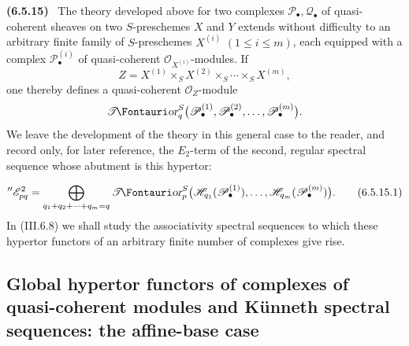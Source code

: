 \documentclass[10pt,oneside]{book}
\newcommand{\sh}[1]{\mathscr{#1}}
\newcommand{\shTor}{\sh{T}\textup{\kern-2.2pt{\Fontauri\slshape or}}}
\newcommand{\sref}[2][]{(#2)}
\newcommand{\oldpage}[2][]{\setcounter{footnote}{0}\marginpar{\scriptsize\textbf{#1}~|~#2}\ignorespaces}
\newenvironment{env}[1][]{\par\medskip\noindent\textbf{(#1)}\ }{\par}
\begin{document}
\begin{env}[6.5.15]
\label{III.6.5.15}
The theory developed above for two complexes
$\sh P_\bullet,\sh Q_\bullet$ of quasi-coherent sheaves on two
$S$-preschemes $X$ and $Y$ extends without difficulty to an
arbitrary finite family of $S$-preschemes $X^{(i)}$
$(1\leq i\leq m)$, each equipped with a complex
$\sh P_\bullet^{(i)}$ of quasi-coherent
$\sh O_{X^{(i)}}$-modules.  If
\[
  Z=X^{(1)}\times_SX^{(2)}\times_S\cdots\times_SX^{(m)},
\]
one thereby defines a quasi-coherent $\sh O_Z$-module
\[
  \shTor_q^S
  \bigl(\sh P_\bullet^{(1)},\sh P_\bullet^{(2)},\ldots,
        \sh P_\bullet^{(m)}\bigr).
\]
We leave the development of the theory in this general case to
the reader, and record only, for later reference, the $E_2$-term
of the second, regular spectral sequence whose abutment is this
hypertor:

\oldpage[III]{153}

\[
  ''\sh E_{pq}^2
  =
  \bigoplus_{q_1+q_2+\cdots+q_m=q}
  \shTor_p^S
  \bigl(
    \sh H_{q_1}(\sh P_\bullet^{(1)}),\ldots,
    \sh H_{q_m}(\sh P_\bullet^{(m)})
  \bigr).
  \tag{6.5.15.1}\label{III.6.5.15.1}
\]
In \sref{III.6.8} we shall study the associativity spectral
sequences to which these hypertor functors of an arbitrary
finite number of complexes give rise.
\end{env}

\subsection{Global hypertor functors of complexes of
quasi-coherent modules and K\"unneth spectral sequences: the
affine-base case}
\label{subsection:III.6.6}
\end{document}
